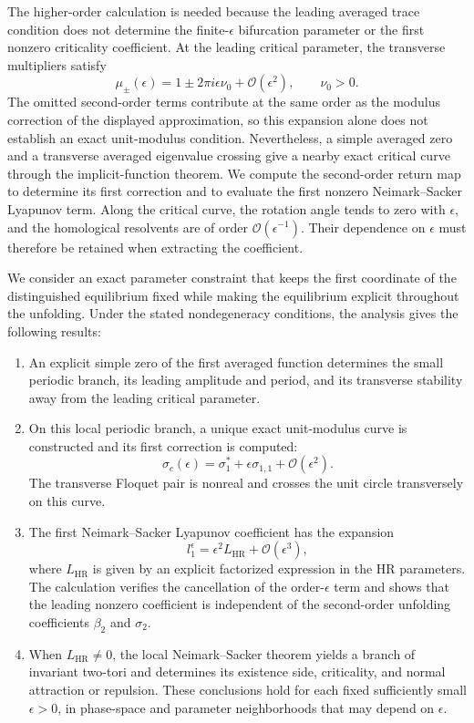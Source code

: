 \documentclass[11pt]{amsart}
\theoremstyle{remark}
\begin{document}
The higher-order calculation is needed because the leading averaged
trace condition does not determine the finite-\(\epsilon\) bifurcation
parameter or the first nonzero criticality coefficient. At the leading
critical parameter, the transverse multipliers satisfy
\[
  \mu_{\pm}(\epsilon)
  =1\pm2\pi i\epsilon\nu_0+\mathcal{O}(\epsilon^2),
  \qquad \nu_0>0.
\]
The omitted second-order terms contribute at the same order as the
modulus correction of the displayed approximation, so this expansion
alone does not establish an exact unit-modulus condition. Nevertheless,
a simple averaged zero and a transverse averaged eigenvalue crossing
give a nearby exact critical curve through the implicit-function
theorem. We compute the second-order return map to determine its first
correction and to evaluate the first nonzero Neimark--Sacker Lyapunov
term. Along the critical curve, the rotation angle tends to zero with
\(\epsilon\), and the homological resolvents are of order
\(\mathcal{O}(\epsilon^{-1})\). Their dependence on \(\epsilon\) must
therefore be retained when extracting the coefficient.

We consider an exact parameter constraint that keeps the first
coordinate of the distinguished equilibrium fixed while making the
equilibrium explicit throughout the unfolding. Under the stated
nondegeneracy conditions, the analysis gives the following results:
\begin{enumerate}
\renewcommand{\labelenumi}{\textup{(\roman{enumi})}}

\item An explicit simple zero of the first averaged function determines
the small periodic branch, its leading amplitude and period, and its
transverse stability away from the leading critical parameter.

\item On this local periodic branch, a unique exact unit-modulus curve
is constructed and its first correction is computed:
\[
  \sigma_c(\epsilon)
  =\sigma_1^*+\epsilon\sigma_{1,1}
   +\mathcal{O}(\epsilon^2).
\]
The transverse Floquet pair is nonreal and crosses the unit circle
transversely on this curve.

\item The first Neimark--Sacker Lyapunov coefficient has the expansion
\[
  l_1^\epsilon
  =\epsilon^2L_{\mathrm{HR}}+\mathcal{O}(\epsilon^3),
\]
where \(L_{\mathrm{HR}}\) is given by an explicit factorized expression
in the HR parameters. The calculation verifies the cancellation of the
order-\(\epsilon\) term and shows that the leading nonzero coefficient
is independent of the second-order unfolding coefficients
\(\beta_2\) and \(\sigma_2\).

\item When \(L_{\mathrm{HR}}\ne0\), the local Neimark--Sacker theorem
yields a branch of invariant two-tori and determines its existence side,
criticality, and normal attraction or repulsion. These conclusions hold
for each fixed sufficiently small \(\epsilon>0\), in phase-space and
parameter neighborhoods that may depend on \(\epsilon\).

\end{enumerate}
\end{document}
